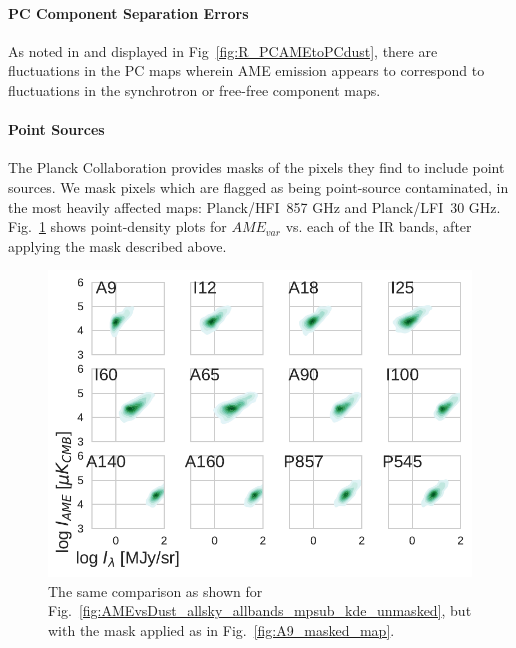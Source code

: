         \paragraph{PC Component Separation Errors}
          As noted in \cite{planck15X, hensley16} and displayed in Fig~\ref{fig:R_PCAMEtoPCdust}, there are fluctuations in the PC maps wherein AME emission appears to correspond to fluctuations in the synchrotron or free-free component maps.

       \paragraph{Point Sources}
         The Planck Collaboration provides masks of the pixels they find to include point sources. We mask pixels which are flagged as being point-source contaminated, in the most heavily affected maps: Planck/HFI~857 GHz and Planck/LFI~30 GHz.
           Fig.~\ref{fig:AMEvsDust_allsky_allbands_mpsub_kde_masked} shows point-density plots for $AME_{var}$ vs. each of the IR bands, after applying the mask described above.
              \begin{figure}
                \includegraphics[width=\textwidth]{../Plots/ch_allsky/AMEvsDust_allsky_allbands_mpsub_kde_masked.pdf}
                \centering
                \caption{The same comparison as shown for Fig.~\ref{fig:AMEvsDust_allsky_allbands_mpsub_kde_unmasked}, but with the mask applied as in Fig.~\ref{fig:A9_masked_map}.}
                \label{fig:AMEvsDust_allsky_allbands_mpsub_kde_masked}
              \end{figure}
